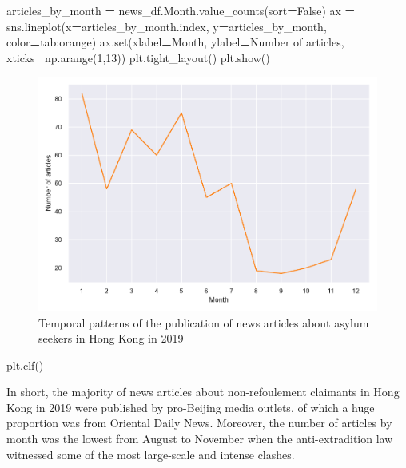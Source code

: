 \documentclass[a4paper, oneside]{report}
\newenvironment{Shaded}{\begin{snugshade}}{\end{snugshade}}
\newcommand{\BuiltInTok}[1]{#1}
\newcommand{\DecValTok}[1]{\textcolor[rgb]{0.00,0.00,0.81}{#1}}
\newcommand{\NormalTok}[1]{#1}
\newcommand{\OperatorTok}[1]{\textcolor[rgb]{0.81,0.36,0.00}{\textbf{#1}}}
\newcommand{\StringTok}[1]{\textcolor[rgb]{0.31,0.60,0.02}{#1}}
\newcommand{\VariableTok}[1]{\textcolor[rgb]{0.00,0.00,0.00}{#1}}
\renewenvironment{Shaded}
{
  \vspace{4pt}%
  \begin{snugshade}%
}{%
  \end{snugshade}%
  \vspace{4pt}%
}
\begin{document}
\begin{Shaded}
\begin{Highlighting}[]
\NormalTok{articles\_by\_month }\OperatorTok{=}\NormalTok{ news\_df.Month.value\_counts(sort}\OperatorTok{=}\VariableTok{False}\NormalTok{)}
\NormalTok{ax }\OperatorTok{=}\NormalTok{ sns.lineplot(x}\OperatorTok{=}\NormalTok{articles\_by\_month.index, y}\OperatorTok{=}\NormalTok{articles\_by\_month, color}\OperatorTok{=}\StringTok{\textquotesingle{}tab:orange\textquotesingle{}}\NormalTok{)}
\NormalTok{ax.}\BuiltInTok{set}\NormalTok{(xlabel}\OperatorTok{=}\StringTok{\textquotesingle{}Month\textquotesingle{}}\NormalTok{, ylabel}\OperatorTok{=}\StringTok{\textquotesingle{}Number of articles\textquotesingle{}}\NormalTok{, xticks}\OperatorTok{=}\NormalTok{np.arange(}\DecValTok{1}\NormalTok{,}\DecValTok{13}\NormalTok{))}
\NormalTok{plt.tight\_layout()}
\NormalTok{plt.show()}
\end{Highlighting}
\end{Shaded}

\begin{figure}
\centering
\includegraphics{versions/Chin_Chapter_4_2022-01-10_files/figure-latex/unnamed-chunk-2-3.pdf}
\caption{Temporal patterns of the publication of news articles about
asylum seekers in Hong Kong in 2019}
\end{figure}

\begin{Shaded}
\begin{Highlighting}[]
\NormalTok{plt.clf()}
\end{Highlighting}
\end{Shaded}

In short, the majority of news articles about non-refoulement claimants
in Hong Kong in 2019 were published by pro-Beijing media outlets, of
which a huge proportion was from Oriental Daily News. Moreover, the
number of articles by month was the lowest from August to November when
the anti-extradition law witnessed some of the most large-scale and
intense clashes.
\end{document}
